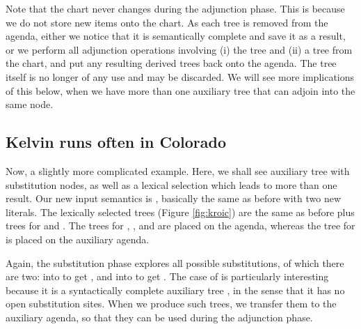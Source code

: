 Note that the chart never changes during the adjunction phase.  This
is because we do not store new items onto the chart.  As each tree is
removed from the agenda, either we notice that it is semantically
complete and save it as a result, or we perform all adjunction
operations involving (i) the tree and (ii) a tree from the chart, and
put any resulting derived trees back onto the agenda.  The tree itself
is no longer of any use and may be discarded.  We will see more
implications of this below, when we have more than one auxiliary tree
that can adjoin into the same node.

\subsection{Kelvin runs often in Colorado}
Now, a slightly more complicated example.  Here, we shall see auxiliary
tree with substitution nodes, as well as a lexical selection which leads
to more than one result.  Our new input semantics
is , basically the same as before with two new literals.
The lexically selected trees (Figure \ref{fig:kroic}) are the same as
before plus trees for  and .
The trees for , ,
 and  are placed on the agenda,
whereas the tree for  is placed on the auxiliary
agenda.


Again, the substitution phase explores all possible substitutions, of
which there are two:  into  to
get , and  into
 to get .  The case of
 is particularly interesting because it is a
syntactically complete auxiliary tree
, in the sense that it has no open
substitution sites.  When we produce such trees, we transfer them to the
auxiliary agenda, so that they can be used during the adjunction phase.

